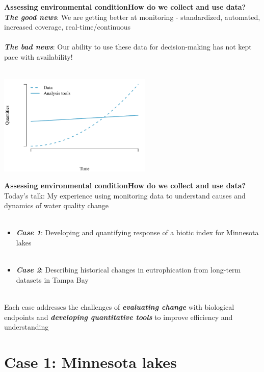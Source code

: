 \documentclass[serif]{beamer}\usepackage[]{graphicx}\usepackage[]{color}
\newcommand{\emtxt}[1]{\textbf{\textit{#1}}}
\begin{document}
\begin{frame}{\textbf{Assessing environmental condition}}{\textbf{How do we collect and use data?}}
\onslide<+->
\emtxt{The good news}: We are getting better at monitoring - standardized, automated, increased coverage, real-time/continuous \\~\\
\emtxt{The bad news}: Our ability to use these data for decision-making has not kept pace with availability! \\~\\
\onslide<+->


{\centering \includegraphics[width=0.55\textwidth]{fig/theo-1} 

}



\end{frame}

\begin{frame}{\textbf{Assessing environmental condition}}{\textbf{How do we collect and use data?}}
\onslide<+->
Today's talk: My experience using monitoring data to understand causes and dynamics of water quality change\\~\\
\begin{itemize}
\item \emtxt{Case 1}: Developing and quantifying response of a biotic index for Minnesota lakes \\~\\
\item \emtxt{Case 2}: Describing historical changes in eutrophication from long-term datasets in Tampa Bay \\~\\
\end{itemize}
\onslide<+->
Each case addresses the challenges of \emtxt{evaluating change} with biological endpoints and \emtxt{developing quantitative tools} to improve efficiency and understanding
\end{frame}

\section{Case 1: Minnesota lakes}
\end{document}
